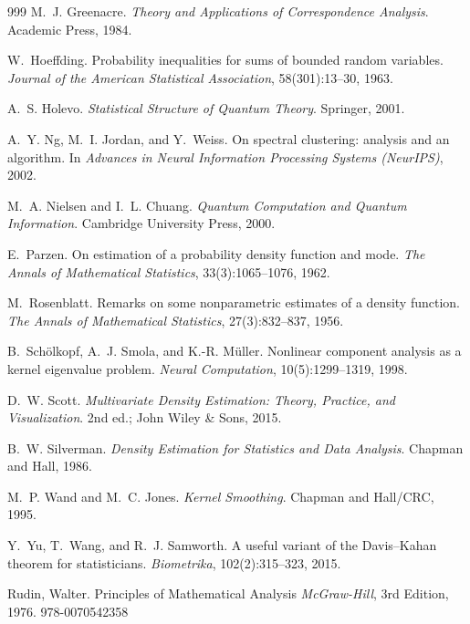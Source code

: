 \documentclass[preprint,11pt]{elsarticle}
\begin{document}
\begin{thebibliography}{999}
M.~J. Greenacre.
\newblock \emph{Theory and Applications of Correspondence Analysis}.
\newblock Academic Press, 1984.

W.~Hoeffding.
\newblock Probability inequalities for sums of bounded random variables.
\newblock \emph{Journal of the American Statistical Association}, 58(301):13--30, 1963.

A.~S. Holevo.
\newblock \emph{Statistical Structure of Quantum Theory}.
\newblock Springer, 2001.

A.~Y. Ng, M.~I. Jordan, and Y.~Weiss.
\newblock On spectral clustering: analysis and an algorithm.
\newblock In \emph{Advances in Neural Information Processing Systems (NeurIPS)}, 2002.

M.~A. Nielsen and I.~L. Chuang.
\newblock \emph{Quantum Computation and Quantum Information}.
\newblock Cambridge University Press, 2000.

E.~Parzen.
\newblock On estimation of a probability density function and mode.
\newblock \emph{The Annals of Mathematical Statistics}, 33(3):1065--1076, 1962.

M.~Rosenblatt.
\newblock Remarks on some nonparametric estimates of a density function.
\newblock \emph{The Annals of Mathematical Statistics}, 27(3):832--837, 1956.

B.~Sch{\"o}lkopf, A.~J. Smola, and K.-R. M{\"u}ller.
\newblock Nonlinear component analysis as a kernel eigenvalue problem.
\newblock \emph{Neural Computation}, 10(5):1299--1319, 1998.

D.~W. Scott.
\newblock \emph{Multivariate Density Estimation: Theory, Practice, and Visualization}.
\newblock 2nd ed.; John Wiley \& Sons, 2015.

B.~W. Silverman.
\newblock \emph{Density Estimation for Statistics and Data Analysis}.
\newblock Chapman and Hall, 1986.

M.~P. Wand and M.~C. Jones.
\newblock \emph{Kernel Smoothing}.
\newblock Chapman and Hall/CRC, 1995.

Y.~Yu, T.~Wang, and R.~J. Samworth.
\newblock A useful variant of the {Davis--Kahan} theorem for statisticians.
\newblock \emph{Biometrika}, 102(2):315--323, 2015.

  Rudin, Walter.
  \newblock Principles of Mathematical Analysis
  \newblock \emph{McGraw-Hill}, 3rd Edition, 1976. 978-0070542358


\end{thebibliography}
\end{document}
